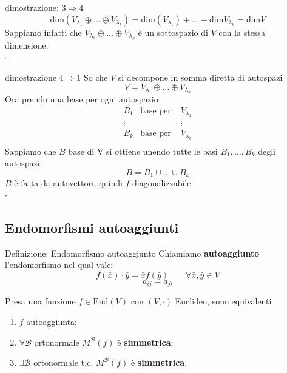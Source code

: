 \documentclass[x11names]{article}
\newcommand*{\QEDB}{\null\nobreak\hfill\ensuremath{\square}}%
\begin{document}
\begin{es}{dimostrazione: $3 \Rightarrow 4$}
\[
\text{dim}\left(V_{\lambda_{1}} \oplus \dots \oplus V_{\lambda_{k}}\right) = \text{dim}\left(V_{\lambda_{1}}\right) + \dots + \text{dim}V_{\lambda_{k}} = \text{dim}V
\] 
Sappiamo infatti che $V_{\lambda_{1}} \oplus \dots \oplus V_{\lambda_{k}}$ è un sottospazio di $V$ con la stessa dimensione.
\\
\QEDB
\end{es}

\begin{es}{dimostrazione $4 \Rightarrow 1$}
So che $V$ si decompone in somma diretta di autospazi
\[
V = V_{\lambda_{1}} \oplus \dots \oplus V_{\lambda_{k}}
\] 
Ora prendo una base per ogni autospazio
\[
\begin{array}{ccc}
	B_1 & \text{base per } & V_{\lambda_{1}} \\
	\vdots & & \vdots \\
	B_k & \text{base per } & V_{\lambda_{k}} \\
\end{array}
\] 
Sappiamo che $B$ base di V si ottiene unendo tutte le basi $B_1, \dots, B_{k}$ degli autospazi:
\[
B = B_1 \cup \dots \cup B_{k}
\]
$B$ è fatta da autovettori, quindi $f$ diagonalizzabile.
\\
\QEDB
\end{es}



\subsection{Endomorfismi autoaggiunti}

\begin{center}
\colorbox{myblue}{\begin{minipage}{5.75in}
\begin{blues}{Definizione: Endomorfismo autoaggiunto}
Chiamiamo \textbf{autoaggiunto} l'endomorfismo  nel qual vale:\[
f\left(\bar{x}\right)\cdot \bar{y} = \bar{x}f\left(\bar{y}\right) \qquad \forall\bar{x},\bar{y} \in V
\] 
\[
a_{ij} = a_{ji}
\]
\end{blues}
\end{minipage}}        
\end{center}

\noindent
Presa una funzione $f \in \text{End}(V)$ con $\left(V,\cdot\right)$ Euclideo, sono equivalenti
\begin{enumerate}
	\item $f$ autoaggiunta;
	\item $\forall \mathcal{B}$ ortonormale $M^\mathcal{B}(f)$ è \textbf{simmetrica};
	\item $\exists \mathcal{B}$ ortonormale t.c. $M^\mathcal{B}(f)$ è \textbf{simmetrica}.
\end{enumerate}
\end{document}
